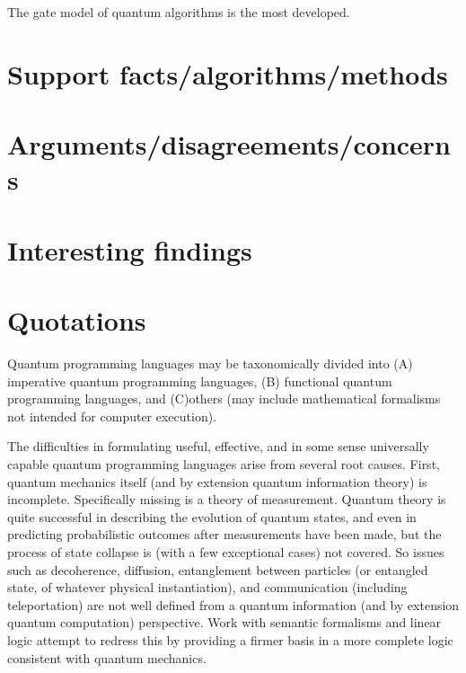 \documentclass{article}
\begin{document}
The gate model of quantum algorithms is the most developed. 

\section{Support facts/algorithms/methods}
\section{Arguments/disagreements/concerns}
\section{Interesting findings}
\section{Quotations}

Quantum programming languages may be taxonomically divided into (A) imperative quantum programming languages, (B) functional quantum programming languages, and (C)others (may include mathematical formalisms not intended for computer execution).

The difficulties in formulating useful, effective, and in some sense universally capable quantum programming languages arise from several root causes. First, quantum mechanics itself (and by extension quantum information theory) is incomplete. Specifically missing is a theory of measurement. Quantum theory is quite successful in describing the evolution of quantum states, and even in predicting probabilistic outcomes after measurements have been made, but the process of state collapse is (with a few exceptional cases) not covered. So issues such as decoherence, diffusion, entanglement between particles (or entangled state, of whatever physical instantiation), and communication (including teleportation) are not well defined from a quantum information (and by extension quantum computation) perspective. Work with semantic formalisms and linear logic attempt to redress this by providing a firmer basis in a more complete logic consistent with quantum mechanics.
\end{document}
